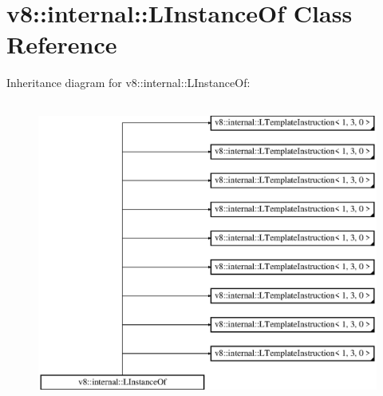 \hypertarget{classv8_1_1internal_1_1_l_instance_of}{}\section{v8\+:\+:internal\+:\+:L\+Instance\+Of Class Reference}
\label{classv8_1_1internal_1_1_l_instance_of}
Inheritance diagram for v8\+:\+:internal\+:\+:L\+Instance\+Of\+:\begin{figure}[H]
\begin{center}
\leavevmode
\includegraphics[height=10.000000cm]{classv8_1_1internal_1_1_l_instance_of}
\end{center}
\end{figure}
